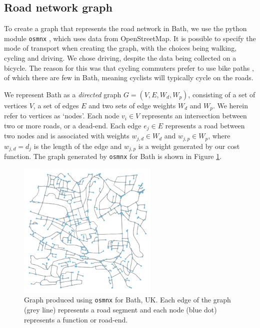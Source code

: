 \documentclass[11pt]{report}
\begin{document}

\subsection{Road network graph} \label{network_graph}

To create a graph that represents the road network in Bath, we use the python module \texttt{osmnx} \citep{boeing2017osmnx}, which uses data from OpenStreetMap. It is possible to specify the mode of transport when creating the graph, with the choices being walking, cycling and driving. We chose driving, despite the data being collected on a bicycle. The reason for this was that cycling commuters prefer to use bike paths \citep{broach2012wherecyclistsride, skov_petersen2018cyclingpreferences}, of which there are few in Bath, meaning cyclists will typically cycle on the roads.

We represent Bath as a \textit{directed} graph $G = (V, E, W_d, W_p)$, consisting of a set of vertices $V$, a set of edges $E$ and two sets of edge weights $W_d$ and $W_p$. We herein refer to vertices as `nodes'. Each node $v_i \in V$ represents an intersection between two or more roads, or a dead-end. Each edge $e_j \in E$ represents a road between two nodes and is associated with weights $w_{j, d} \in W_d$ and $w_{j, p} \in W_p$, where $w_{j, d} = d_j$ is the length of the edge and $w_{j, p}$ is a weight generated by our cost function. The graph generated by \texttt{osmnx} for Bath is shown in Figure \ref{fig:network_graph}.

\begin{figure}[!tb]
\centering
\includegraphics[width=0.6\textwidth]{images/network_graph}
\caption[\texttt{osmnx} graph for Bath.]{Graph produced using \texttt{osmnx} for Bath, UK. Each edge of the graph (grey line) represents a road segment and each node (blue dot) represents a function or road-end.}
\label{fig:network_graph}
\end{figure}
\end{document}
